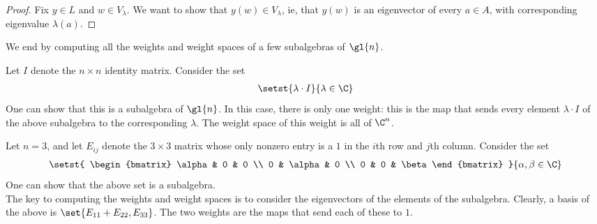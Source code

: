 \begin{proof}
    Fix $y \in L$ and $w \in V_{\lambda}$. We want to show that $y(w) \in V_{\lambda}$, ie, that $y(w)$ is an eigenvector of every $a \in A$, with corresponding eigenvalue $\lambda(a)$.
\end{proof}

We end by computing all the weights and weight spaces of a few subalgebras of $\gl{n}$.

\begin{boxexample}
    Let $I$ denote the $n \times n$ identity matrix. Consider the set
    \begin{align*}
        \setst{\lambda \cdot I}{\lambda \in \C}
    \end{align*}
    One can show that this is a subalgebra of $\gl{n}$. In this case, there is only one weight: this is the map that sends every element $\lambda \cdot I$ of the above subalgebra to the corresponding $\lambda$. The weight space of this weight is all of $\C^n$.
\end{boxexample}

\begin{boxexample}
    Let $n = 3$, and let $E_{ij}$ denote the $3 \times 3$ matrix whose only nonzero entry is a $1$ in the $i$th row and $j$th column. Consider the set
    \begin{align*}
        \setst{
            \begin{bmatrix}
                \alpha & 0 & 0 \\
                0 & \alpha & 0 \\
                0 & 0 & \beta
            \end{bmatrix}
        }{
            \alpha, \beta \in \C
        }
    \end{align*}
    One can show that the above set is a subalgebra. \\

    The key to computing the weights and weight spaces is to consider the eigenvectors of the elements of the subalgebra. Clearly, a basis of the above is $\set{E_{11} + E_{22}, E_{33}}$. The two weights are the maps that send each of these to $1$. \sorry
\end{boxexample}

